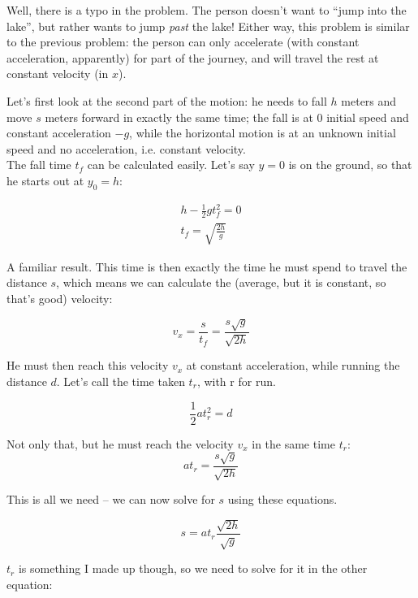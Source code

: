 \documentclass[12pt,a4paper]{report}
\begin{document}
Well, there is a typo in the problem. The person doesn't want to ``jump into the lake'', but rather wants to jump \emph{past} the lake! Either way, this problem is similar to the previous problem: the person can only accelerate (with constant acceleration, apparently) for part of the journey, and will travel the rest at constant velocity (in $x$).

Let's first look at the second part of the motion: he needs to fall $h$ meters and move $s$ meters forward in exactly the same time; the fall is at 0 initial speed and constant acceleration $-g$, while the horizontal motion is at an unknown initial speed and no acceleration, i.e. constant velocity.\\
The fall time $t_f$ can be calculated easily. Let's say $y = 0$ is on the ground, so that he starts out at $y_0 = h$:

\begin{align}
h - \frac{1}{2} g t_f^2 = 0\\
t_f = \sqrt{\frac{2 h}{g}}
\end{align}

A familiar result. This time is then exactly the time he must spend to travel the distance $s$, which means we can calculate the (average, but it is constant, so that's good) velocity:

\begin{equation}
v_x = \frac{s}{t_f} = \frac{s \sqrt{g}}{\sqrt{2h}}
\end{equation}

He must then reach this velocity $v_x$ at constant acceleration, while running the distance $d$. Let's call the time taken $t_r$, with r for run.

\begin{equation}
\frac{1}{2}a t_r^2 = d
\end{equation}

Not only that, but he must reach the velocity $v_x$ in the same time $t_r$:
\begin{equation}
a t_r = \frac{s \sqrt{g}}{\sqrt{2h}}
\end{equation}

This is all we need -- we can now solve for $s$ using these equations.

\begin{equation}
s = a t_r \frac{\sqrt{2h}}{\sqrt{g}}
\end{equation}

$t_r$ is something I made up though, so we need to solve for it in the other equation:
\end{document}
